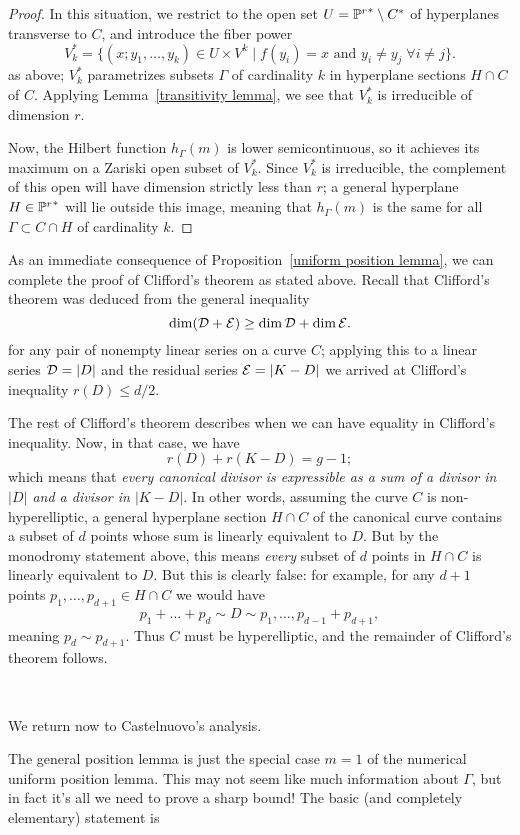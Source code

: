 \begin{proof}
In this situation, we restrict to the open set $U = {\PP^r}^* \setminus C^*$ of hyperplanes transverse to $C$, and introduce the fiber power
$$
V_k^* = \{ (x; y_1,\dots, y_k) \in U \times V^k \mid f(y_i) = x \text{ and } y_i \neq y_j \; \forall i \neq j\}.
$$
as above; $V_k^*$ parametrizes subsets $\Gamma$ of cardinality $k$ in hyperplane sections $H \cap C$ of $C$. Applying Lemma~\ref{transitivity lemma}, we see that $V_k^*$ is irreducible of dimension $r$. 

Now, the Hilbert function $h_\Gamma(m)$ is lower semicontinuous, so it achieves its maximum on a Zariski open subset of $V_k^*$. Since $V_k^*$ is irreducible, the complement of this open will have dimension strictly less than $r$;  a general hyperplane $H \in {\PP^r}^*$ will lie outside this image, meaning that $h_\Gamma(m)$ is the same for all $\Gamma \subset C \cap H$ of cardinality $k$.
\end{proof}

As an immediate consequence of Proposition~\ref{uniform position lemma}, we can complete the proof of Clifford's theorem as stated above. Recall that Clifford's theorem was deduced from the general inequality 
$$
\dim(\cD + \cE) \geq \dim \cD + \dim \cE.
$$
for any pair of nonempty linear series on a curve $C$; applying this to a linear series $\cD = |D|$ and the residual series $\cE = |K-D|$ we arrived at Clifford's inequality $r(D) \leq d/2$.

The rest of Clifford's theorem describes when we can have equality in Clifford's inequality. Now, in that case, we have
$$
r(D) + r(K-D) = g-1;
$$
which means that \emph{every canonical divisor is expressible as a sum of a divisor in $|D|$ and a divisor in $|K-D|$}. In other words, assuming the curve $C$ is non-hyperelliptic, a general hyperplane section $H \cap C$ of the canonical curve contains a subset of $d$ points whose sum is linearly equivalent to $D$. But by the monodromy statement above, this means \emph{every} subset of $d$ points in $H \cap C$ is linearly equivalent to $D$. But this is clearly false: for example, for any $d+1$ points $p_1,\dots,p_{d+1} \in H \cap C$ we would have
$$
p_1 + \dots + p_d \sim D \sim p_1,\dots, p_{d-1} + p_{d+1},
$$
meaning $p_d \sim p_{d+1}$. Thus $C$ must be hyperelliptic, and the remainder of Clifford's theorem follows.

\

We return now to Castelnuovo's analysis.

The general position lemma is just the special case $m=1$ of the numerical uniform position lemma. This may not seem like much information about $\Gamma$, but in fact it's all we need to prove a sharp bound! The basic (and completely elementary) statement is

